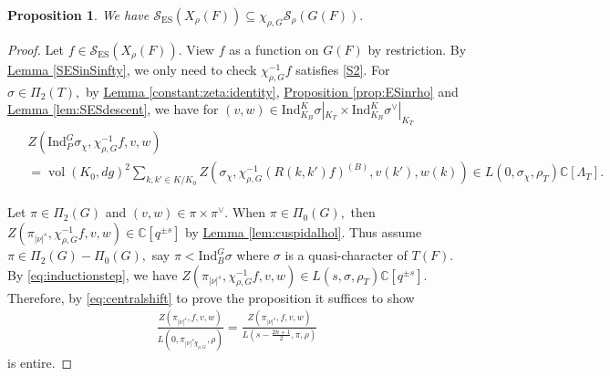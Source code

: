 \documentclass[10pt]{amsart}
\newtheorem{proposition}[theorem]{Proposition}
\theoremstyle{definition}
\numberwithin{equation}{section}
\DeclareMathOperator{\vol}{\mathrm{vol}}
\numberwithin{equation}{subsection}
\newcommand{\Ind}{\mathrm{Ind}}
\newcommand{\CC}{\mathbb{C}}
\begin{document}
\begin{proposition}\label{prop:contain}
    We have $\mathcal{S}_{\mathrm{ES}}(X_\rho(F))\subseteq \chi_{\rho,G}\mathcal{S}_\rho(G(F)).$ 
\end{proposition}

\begin{proof}
    Let $f\in \mathcal{S}_{\mathrm{ES}}(X_\rho(F)).$ View $f$ as a function on $G(F)$ by restriction. By \hyperref[SESinSinfty]{Lemma \ref{SESinSinfty}}, we only need to check $\chi_{\rho,G}^{-1}f$ satisfies \eqref{S2}. For $\sigma\in \Pi_2(T),$ by \hyperref[constant:zeta:identity]{Lemma \ref{constant:zeta:identity}}, \hyperref[prop:ESinrho]{Proposition \ref{prop:ESinrho}} and \hyperref[lem:SESdescent]{Lemma  \ref{lem:SESdescent}}, we have for $(v,w)\in \Ind_{K_B}^K \sigma|_{K_T}\times \Ind_{K_B}^K \sigma^\lor |_{K_T}$
    \begin{align}\label{eq:inductionstep}
    \begin{split}
        &Z(\mathrm{Ind}_P^G \sigma_\chi,\chi_{\rho,G}^{-1}f,v,w)\\
        &=\vol(K_0,dg)^2\sum_{k,k'\in K/K_0} Z(\sigma_\chi,\chi_{\rho,G}^{-1}(R(k,k')f)^{(B)},v(k'),w(k))\in L(0,\sigma_\chi,\rho_T)\CC[\Lambda_T].
    \end{split}
    \end{align}
 
Let $\pi\in \Pi_2(G)$ and $(v,w)\in \pi\times\pi^\lor.$ When $\pi\in \Pi_0(G),$ then $Z(\pi_{|\nu|^s},\chi_{\rho,G}^{-1}f,v,w)\in \CC[q^{\pm s}]$ by \hyperref[lem:cuspidalhol]{Lemma \ref{lem:cuspidalhol}}. Thus assume $\pi\in \Pi_2(G)-\Pi_0(G),$ say $\pi< \Ind_B^G \sigma$ where $\sigma$ is a quasi-character of $T(F)$. By \eqref{eq:inductionstep}, we have $Z(\pi_{|\nu|^s},\chi_{\rho,G}^{-1}f,v,w)\in L(s,\sigma,\rho_{T})\CC[q^{\pm s}]$. Therefore, by \eqref{eq:centralshift} to prove the proposition it suffices to show
\begin{align}\label{eq:containment:entire}
    \frac{Z(\pi_{|\nu|^s},f,v,w)}{L(0,\pi_{|\nu|^s\chi_{\rho,G}},\rho)}= \frac{Z(\pi_{|\nu|^s},f,v,w)}{L(s-\tfrac{2n+1}{2},\pi,\rho)}
\end{align}
is entire.


\end{proof}
\end{document}
